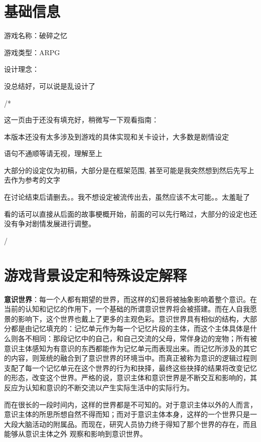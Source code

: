\documentclass[12pt, a4paper]{article}
\begin{document}
    \section*{基础信息}
    游戏名称：破碎之忆

    游戏类型：ARPG

    设计理念：
    
        \quad 没总结好，可以说是乱设计了

    \noindent /*
   
    这一页由于还没有填充好，稍微写一下观看指南：
        
        本版本还没有太多涉及到游戏的具体实现和关卡设计，大多数是剧情设定

        语句不通顺等请无视，理解至上

        大部分的设定仅为初稿，大部分是在框架范围, 甚至可能是我突然想到然后先写上去作为参考的文字

        在讨论结束后请删去。。我不想设定被流传出去，虽然应该不太可能。。太羞耻了

        看的话可以直接从后面的故事梗概开始，前面的可以先行略过，大部分的设定也还没有争对剧情发展进行调整。

    \noindent */
    \newpage 

    \section*{游戏背景设定和特殊设定解释}
        
        \textbf{意识世界}：每一个人都有期望的世界，而这样的幻景将被抽象影响着整个意识。在当前的认知和记忆的作用下，一个基础的所谓意识世界将会被搭建。而在人自我愿景的影响下，这个世界也戴上了更多的主观色彩。意识世界具有相似的结构，大部分都是由记忆填充的：记忆单元作为每一个记忆片段的主体，而这个主体具体是什么则各不相同：那段记忆中的自己，和自己交流的父母，常伴身边的宠物；所有被意识主体感知为有意识的东西都能作为记忆单元而表现出来。而记忆所涉及的其它的内容，则笼统的融合到了意识世界的环境当中。而真正被称为意识的逻辑过程则支配了每一个记忆单元在这个世界的行为和抉择，最终这些抉择的结果将改变记忆的形态，改变这个世界。严格的说，意识主体和意识世界是不断交互和影响的，其反应为认知和意识的不断交流以产生实际生活中的实际行为。 
        
       而在很长的一段时间内，这样的世界都是不可知的。对于意识主体以外的人而言，意识主体的所思所想自然不得而知；而对于意识主体本身，这样的一个世界只是一大段大脑活动的附属品。而现在，研究人员协力终于得知了那个世界的存在，而且能够从意识主体之外
        观察和影响到意识世界。 
\end{document}
